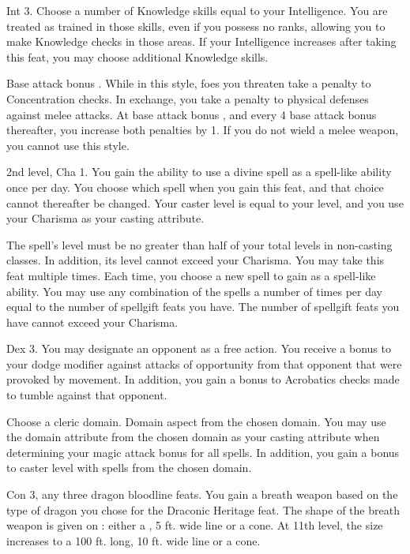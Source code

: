  Int 3.
 Choose a number of Knowledge skills equal to your Intelligence. You are treated as trained in those skills, even if you possess no ranks, allowing you to make Knowledge checks in those areas. If your Intelligence increases after taking this feat, you may choose additional Knowledge skills.

 Base attack bonus .
 While in this style, foes you threaten take a  penalty to Concentration checks. In exchange, you take a  penalty to physical defenses against melee attacks. At base attack bonus , and every 4 base attack bonus thereafter, you increase both penalties by 1. If you do not wield a melee weapon, you cannot use this style.

\featpre 2nd level, Cha 1.
\featben You gain the ability to use a divine spell as a spell-like ability once per day. You choose which spell when you gain this feat, and that choice cannot thereafter be changed. Your caster level is equal to your level, and you use your Charisma as your casting attribute.

The spell's level must be no greater than half of your total levels in non-casting classes. In addition, its level cannot exceed your Charisma.
 You may take this feat multiple times. Each time, you choose a new spell to gain as a spell-like ability. You may use any combination of the spells a number of times per day equal to the number of spellgift feats you have. The number of spellgift feats you have cannot exceed your Charisma.

 Dex 3.
 You may designate an opponent as a free action. You receive a  bonus to your dodge modifier against attacks of opportunity from that opponent that were provoked by movement. In addition, you gain a  bonus to Acrobatics checks made to tumble against that opponent.

Choose a cleric domain.
\featpre Domain aspect from the chosen domain.
\featben You may use the domain attribute from the chosen domain as your casting attribute when determining your magic attack bonus for all spells. In addition, you gain a  bonus to caster level with spells from the chosen domain.

 Con 3, any three dragon bloodline feats.
 You gain a breath weapon based on the type of dragon you chose for the Draconic Heritage feat. The shape of the breath weapon is given on : either a \arealarge, 5 ft. wide line or a \areamed cone. At 11th level, the size increases to a 100 ft. long, 10 ft. wide line or a \arealarge cone.

